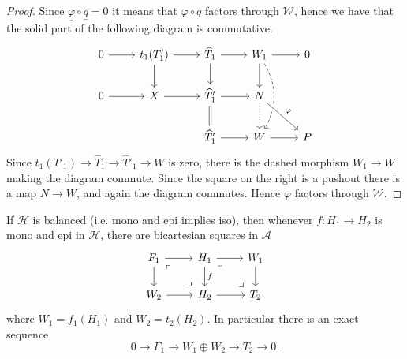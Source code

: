 \begin{proof}
  Since $\underline{\varphi}\circ\underline{q}=\underline{0}$ it means that $\varphi\circ q$ factors through $\mathcal{W}$, hence we
  have that the solid part of the following diagram is commutative.
  \begin{equation*}
    \begin{tikzcd}
      0\arrow{r}
        & t_1(T'_1)\arrow{r}\arrow{d}
          & \widehat{T}_1\arrow{r}\arrow{d}
            & W_1\arrow{r}\arrow{d}\arrow[bend left, dashed]{dd}
              & 0\\
      0\arrow{r}
        & X\arrow{r}
          & \widehat{T}'_1\arrow{r}\arrow[equal]{d}
            & N\arrow[crossing over]{dr}{\varphi}\arrow[dotted]{d}
              &\\
        & & \widehat{T}'_1\arrow{r}
            & W\arrow{r}
              & P
    \end{tikzcd}
  \end{equation*}
  Since $t_1(T'_1)\to \widehat{T}_1\to \widehat{T}'_1\to W$ is zero, there is the dashed morphism $W_1\to W$ making the
  diagram commute. Since the square on the right is a pushout there is a map $N\to W$, and again the diagram commutes.
  Hence $\varphi$ factors through $\mathcal{W}$.
\end{proof}


\begin{lemma}
  If $\mathcal{H}$ is balanced (i.e. mono and epi implies iso), then whenever $f:H_1\to H_2$
  is mono and epi in $\mathcal{H}$, there are bicartesian squares in $\mathcal{A}$
  \begin{equation*}
    \begin{tikzcd}
      F_1\arrow{r}\arrow{d}\arrow[phantom,"\ulcorner",very near start]{dr}
        \arrow[phantom,"\lrcorner",very near end]{dr}
        & H_1\arrow{r}\arrow{d}{f}\arrow[phantom,"\ulcorner",very near start]{dr}
          \arrow[phantom,"\lrcorner",very near end]{dr}
          & W_1\arrow{d}\\
      W_2\arrow{r}
        & H_2\arrow{r}
          & T_2
    \end{tikzcd}
  \end{equation*}
  where $W_1=f_1(H_1)$ and $W_2=t_2(H_2)$. In particular there is an exact sequence
  \begin{equation*}
    0\to F_1\to W_1\oplus W_2 \to T_2\to 0.
  \end{equation*}
\end{lemma}

